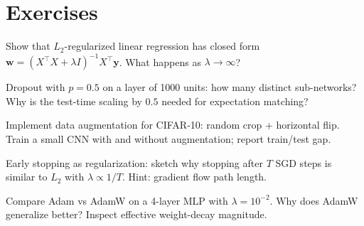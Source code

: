 \section{Exercises}
\begin{exercise} Show that $L_2$-regularized linear regression has closed form $\mathbf{w}= (X^{\top}X+\lambda I)^{-1}X^{\top}\mathbf{y}$. What happens as $\lambda\to\infty$?\end{exercise}
\begin{exercise} Dropout with $p=0.5$ on a layer of 1000 units: how many distinct sub-networks? Why is the test-time scaling by $0.5$ needed for expectation matching?\end{exercise}
\begin{exercise} Implement data augmentation for CIFAR-10: random crop + horizontal flip. Train a small CNN with and without augmentation; report train/test gap.\end{exercise}
\begin{exercise} Early stopping as regularization: sketch why stopping after $T$ SGD steps is similar to $L_2$ with $\lambda\propto1/T$. Hint: gradient flow path length.\end{exercise}
\begin{exercise} Compare Adam vs AdamW on a 4-layer MLP with $\lambda=10^{-2}$. Why does AdamW generalize better? Inspect effective weight-decay magnitude.\end{exercise}
